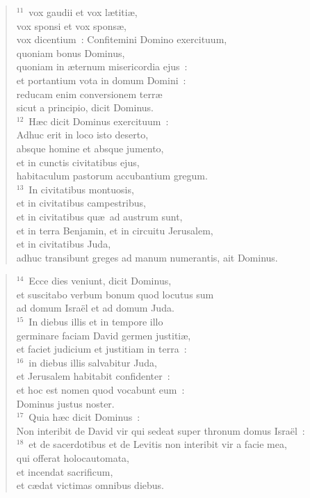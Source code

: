 \begin{verse}
${}^{11}$~vox gaudii et vox l\ae titi\ae ,\\ vox sponsi et vox spons\ae ,\\ vox dicentium~: Confitemini Domino exercituum,\\ quoniam bonus Dominus,\\ quoniam in \ae ternum misericordia ejus~:\\ et portantium vota in domum Domini~:\\ reducam enim conversionem terr\ae \\ sicut a principio, dicit Dominus.\\
${}^{12}$~H\ae c dicit Dominus exercituum~:\\ Adhuc erit in loco isto deserto,\\ absque homine et absque jumento,\\ et in cunctis civitatibus ejus,\\ habitaculum pastorum accubantium gregum.\\
${}^{13}$~In civitatibus montuosis,\\ et in civitatibus campestribus,\\ et in civitatibus qu\ae\ ad austrum sunt,\\ et in terra Benjamin, et in circuitu Jerusalem,\\ et in civitatibus Juda,\\ adhuc transibunt greges ad manum numerantis, ait Dominus.\end{verse}


\begin{verse}${}^{14}$~Ecce dies veniunt, dicit Dominus,\\ et suscitabo verbum bonum quod locutus sum\\ ad domum Isra\"el et ad domum Juda.\\
${}^{15}$~In diebus illis et in tempore illo\\ germinare faciam David germen justiti\ae ,\\ et faciet judicium et justitiam in terra~:\\
${}^{16}$~in diebus illis salvabitur Juda,\\ et Jerusalem habitabit confidenter~:\\ et hoc est nomen quod vocabunt eum~:\\ Dominus justus noster.\\
${}^{17}$~Quia h\ae c dicit Dominus~:\\ Non interibit de David vir qui sedeat super thronum domus Isra\"el~:\\
${}^{18}$~et de sacerdotibus et de Levitis non interibit vir a facie mea,\\ qui offerat holocautomata,\\ et incendat sacrificum,\\ et c\ae dat victimas omnibus diebus.\end{verse}



